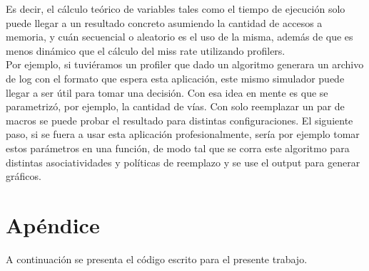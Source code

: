 \documentclass[a4paper,10pt]{article}
\begin{document}
   Es decir, el cálculo teórico de variables tales como el tiempo de ejecución solo puede llegar a un resultado concreto asumiendo la cantidad de accesos a memoria, y cuán secuencial o aleatorio es el uso de la misma, además de que es menos dinámico que el cálculo del miss rate utilizando profilers.\\
   
   Por ejemplo, si tuviéramos un profiler que dado un algoritmo generara un archivo de log con el formato que espera esta aplicación, este mismo simulador puede llegar a ser útil para tomar una decisión. Con esa idea en mente es que se parametrizó, por ejemplo, la cantidad de vías. Con solo reemplazar un par de macros se puede probar el resultado para distintas configuraciones. El siguiente paso, si se fuera a usar esta aplicación profesionalmente, sería por ejemplo tomar estos parámetros en una función, de modo tal que se corra este algoritmo para distintas asociatividades y políticas de reemplazo y se use el output para generar gráficos.

\section{Apéndice}
A continuación se presenta el código escrito para el presente trabajo.\\
\end{document}
